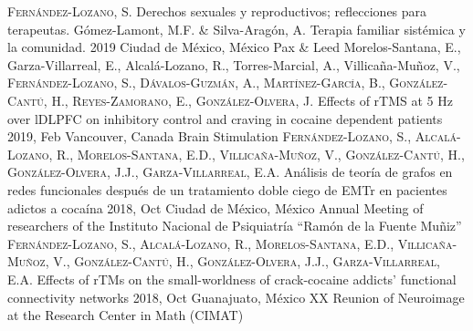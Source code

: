 \vspace{-3mm}
{
\setlength\tabcolsep{0pt} \setlength{\extrarowheight}{0pt}%
\begin{itemize}[leftmargin=5ex, nosep, noitemsep, itemindent=-13pt,
    label=\raisebox{0.25ex}{\tiny$\bullet$}]%
    \vspace{-1.8mm}%
    \cvchapt
        {\scshape{Fernández-Lozano, S.}}
        {Derechos sexuales y reproductivos; reflecciones para terapeutas.}
        {Gómez-Lamont, M.F. \& Silva-Aragón, A.}
        {Terapia familiar sistémica y la comunidad.}
        {2019}
        {Ciudad de México, México}
        {Pax \& Leed}
    \cvposter
        {Morelos-Santana, E., Garza-Villarreal, E., Alcalá-Lozano, R.,
            Torres-Marcial, A., Villicaña-Muñoz, V., \scshape{Fernández-Lozano,
            S.}, Dávalos-Guzmán, A., Martínez-García, B., González-Cantú, H.,
            Reyes-Zamorano, E., González-Olvera, J.}
        {Effects of rTMS at 5 Hz over lDLPFC on inhibitory control and craving
            in cocaine dependent patients}
        {2019, Feb}
        {Vancouver, Canada}
        {Brain Stimulation}
    \cvposter
        {\scshape{Fernández-Lozano, S.}, Alcalá-Lozano, R., Morelos-Santana, E.D.,
            Villicaña-Muñoz, V., González-Cantú, H., González-Olvera, J.J.,
        Garza-Villarreal, E.A.}
        {Análisis de teoría de grafos en redes funcionales después de un
            tratamiento doble ciego de EMTr en pacientes adictos a cocaína
            }
        {2018, Oct}
        {Ciudad de México, México}
        {Annual Meeting of researchers of the Instituto Nacional de Psiquiatría ``Ramón de la Fuente Muñiz''}
    \cvposter
        {\scshape{Fernández-Lozano, S.}, Alcalá-Lozano, R., Morelos-Santana, E.D.,
            Villicaña-Muñoz, V., González-Cantú, H., González-Olvera, J.J.,
        Garza-Villarreal, E.A.}
        {Effects of rTMs on the small-worldness of crack-cocaine addicts' functional connectivity networks}
        {2018, Oct}
        {Guanajuato, México}
        {XX Reunion of Neuroimage at the Research Center in Math (CIMAT)}
\end{itemize}
}
